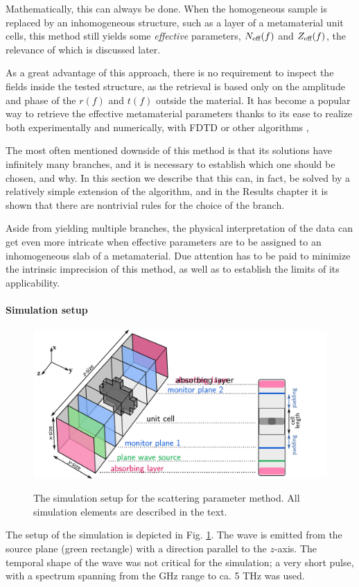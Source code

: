 Mathematically, this can always be done. When the homogeneous sample is replaced by an inhomogeneous structure, such as a layer of a metamaterial unit cells, this method still yields some \textit{effective} parameters, $N_{\text{eff} }(f)$ and $Z_{\text{eff} }(f)$, the relevance of which is discussed later. 

As a great advantage of this approach, there is no requirement to inspect the fields inside the tested structure, as the retrieval is based only on the amplitude and phase of the  $r(f)$ and $t(f)$ outside the material. It has become a popular way to retrieve the effective metamaterial parameters thanks to its ease to realize both experimentally and numerically, with FDTD or other algorithms \cite{terao2011},

The most often mentioned downside of this method is that its solutions have infinitely many branches, and it is necessary to establish which one should be chosen, and why. In this section we describe that this can, in fact, be solved by a relatively simple extension of the algorithm, and in the Results chapter it is shown that there are nontrivial rules for the choice of the branch.

Aside from yielding multiple branches, the physical interpretation of the data can get even more intricate when effective parameters are to be assigned to an inhomogeneous slab of a metamaterial. Due attention has to be paid to minimize the intrinsic imprecision of this method, as well as to establish the limits of its applicability. 
\paragraph{Simulation setup} %
\begin{figure}[ht] \centering \caption{The simulation setup for the scattering parameter method. All simulation elements are described in the text.
} \includegraphics[width=12cm]{img/meep_geometry.pdf}  \label{fg_fdtd_sparam} \end{figure} %
The setup of the simulation is depicted in Fig. \ref{fg_fdtd_sparam}. The wave is emitted from the source plane (green rectangle) with a direction parallel to the $z$-axis. The temporal shape of the wave was not critical for the simulation; a very short pulse, with a spectrum spanning from the GHz range to ca. 5 THz was used. 

